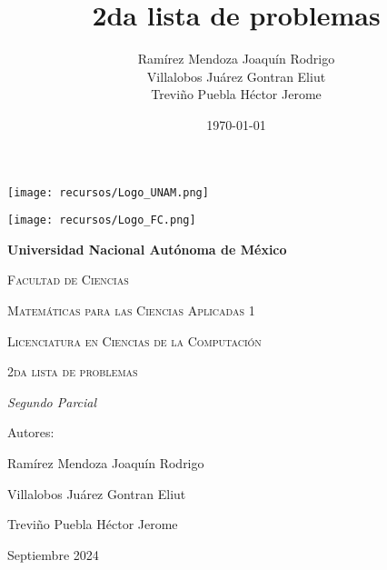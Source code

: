 \documentclass[oneside]{book}
\title{2da lista de problemas}
\author{Ramírez Mendoza Joaquín Rodrigo\\
Villalobos Juárez Gontran Eliut\\
Treviño Puebla Héctor Jerome}
\date{\today}
\begin{document}
\begin{titlepage}

	\begin{minipage}{3cm}
		\begin{center}
			\texttt{[image: recursos/Logo\_UNAM.png]}\par
		\end{center}
	\end{minipage}\hfill
	\begin{minipage}{10cm}

	\end{minipage}\hfill
	\begin{minipage}{3cm}
		\begin{center}
			\texttt{[image: recursos/Logo\_FC.png]}\par
		\end{center}
	\end{minipage}
	\centering
	\vspace{1cm}

	{\bfseries\LARGE Universidad Nacional Autónoma de México \par}

	\vspace{1cm}
	{\scshape\Large Facultad de Ciencias \par}
	\vspace{1cm}
	{\scshape\Large Matemáticas para las Ciencias Aplicadas 1 \par}
	\vspace{1cm}
	{\scshape\Large Licenciatura en Ciencias de la Computación \par}
	\vspace{1cm}
	{\scshape\Huge 2da lista de problemas  \par}
	\vspace{3cm}
	{\itshape\Large Segundo Parcial \par}
	\vfill
	{\Large Autores: \par}
	{\Large Ramírez Mendoza Joaquín Rodrigo \par}
	{\Large Villalobos Juárez Gontran Eliut\par}
	{\Large Treviño Puebla Héctor Jerome \par}
	\vfill
	{\Large Septiembre 2024 \par}
\end{titlepage}
\maketitle




\end{document}
